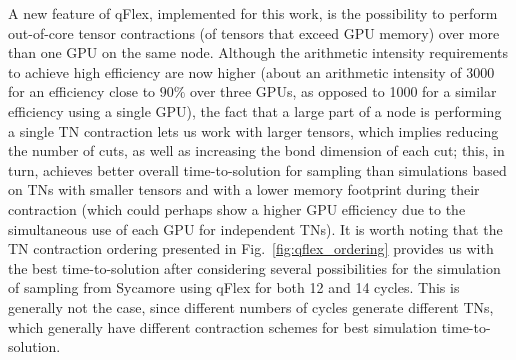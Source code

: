 A new feature of qFlex, implemented for this work, is the possibility to perform out-of-core tensor contractions (of tensors that exceed GPU memory) over more than one GPU on the same node. Although the arithmetic intensity requirements to achieve high efficiency are now higher (about an arithmetic intensity of 3000 for an efficiency close to $90\%$ over three GPUs, as opposed to 1000 for a similar efficiency using a single GPU), the fact that a large part of a node is performing a single TN contraction lets us work with larger tensors, which implies reducing the number of cuts, as well as increasing the bond dimension of each cut; this, in turn, achieves better overall time-to-solution for sampling than simulations based on TNs with smaller tensors and with a lower memory footprint during their contraction (which could perhaps show a higher GPU efficiency due to the simultaneous use of each GPU for independent TNs). It is worth noting that the TN contraction ordering presented in Fig.~\ref{fig:qflex_ordering} provides us with the best time-to-solution after considering several possibilities for the simulation of sampling from Sycamore using qFlex for both 12 and 14 cycles. This is generally not the case, since different numbers of cycles generate different TNs, which generally have different contraction schemes for best simulation time-to-solution.\\

